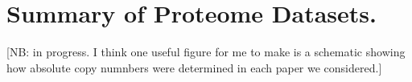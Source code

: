 

\section{Summary of Proteome Datasets.} \label{sec:si_section_datasets}

[NB: in progress. I think one useful figure for me to make is a schematic showing how absolute copy numnbers were determined in each paper we considered.]

%
%
%
%
